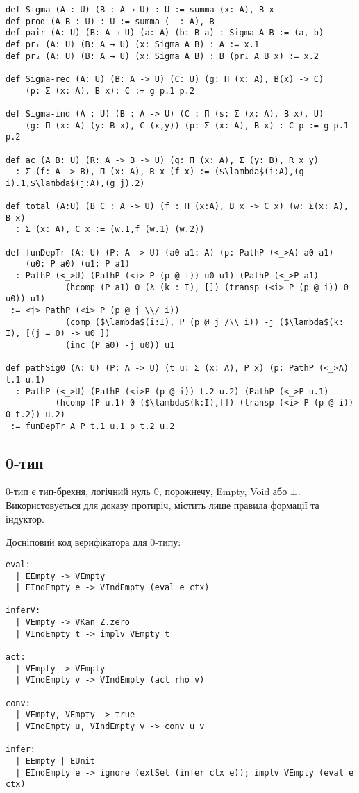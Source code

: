 \begin{lstlisting}[mathescape=true]
def Sigma (A : U) (B : A → U) : U := summa (x: A), B x
def prod (A B : U) : U := summa (_ : A), B
def pair (A: U) (B: A → U) (a: A) (b: B a) : Sigma A B := (a, b)
def pr₁ (A: U) (B: A → U) (x: Sigma A B) : A := x.1
def pr₂ (A: U) (B: A → U) (x: Sigma A B) : B (pr₁ A B x) := x.2

def Sigma-rec (A: U) (B: A -> U) (C: U) (g: Π (x: A), B(x) -> C)
    (p: Σ (x: A), B x): C := g p.1 p.2

def Sigma-ind (A : U) (B : A -> U) (C : Π (s: Σ (x: A), B x), U) 
    (g: Π (x: A) (y: B x), C (x,y)) (p: Σ (x: A), B x) : C p := g p.1 p.2

def ac (A B: U) (R: A -> B -> U) (g: Π (x: A), Σ (y: B), R x y)
  : Σ (f: A -> B), Π (x: A), R x (f x) := ($\lambda$(i:A),(g i).1,$\lambda$(j:A),(g j).2)

def total (A:U) (B C : A -> U) (f : Π (x:A), B x -> C x) (w: Σ(x: A), B x)
  : Σ (x: A), C x := (w.1,f (w.1) (w.2))

def funDepTr (A: U) (P: A -> U) (a0 a1: A) (p: PathP (<_>A) a0 a1)
    (u0: P a0) (u1: P a1)
  : PathP (<_>U) (PathP (<i> P (p @ i)) u0 u1) (PathP (<_>P a1)
            (hcomp (P a1) 0 (λ (k : I), []) (transp (<i> P (p @ i)) 0 u0)) u1)
 := <j> PathP (<i> P (p @ j \\/ i))
            (comp ($\lambda$(i:I), P (p @ j /\\ i)) -j ($\lambda$(k: I), [(j = 0) -> u0 ])
            (inc (P a0) -j u0)) u1

def pathSig0 (A: U) (P: A -> U) (t u: Σ (x: A), P x) (p: PathP (<_>A) t.1 u.1)
  : PathP (<_>U) (PathP (<i>P (p @ i)) t.2 u.2) (PathP (<_>P u.1)
          (hcomp (P u.1) 0 ($\lambda$(k:I),[]) (transp (<i> P (p @ i)) 0 t.2)) u.2)
 := funDepTr A P t.1 u.1 p t.2 u.2
\end{lstlisting}

\newpage
\subsection*{0-тип}

0-тип є тип-брехня, логічний нуль $\mathbb{0}$, порожнечу, Empty, Void або $\bot$.
Використовується для доказу протиріч, містить лише правила формації та індуктор.

Досніповий код верифікатора для 0-типу:
\begin{lstlisting}
eval:
  | EEmpty -> VEmpty
  | EIndEmpty e -> VIndEmpty (eval e ctx)

inferV:
  | VEmpty -> VKan Z.zero
  | VIndEmpty t -> implv VEmpty t

act:
  | VEmpty -> VEmpty
  | VIndEmpty v -> VIndEmpty (act rho v)

conv:
  | VEmpty, VEmpty -> true
  | VIndEmpty u, VIndEmpty v -> conv u v

infer:
  | EEmpty | EUnit
  | EIndEmpty e -> ignore (extSet (infer ctx e)); implv VEmpty (eval e ctx)
\end{lstlisting}

